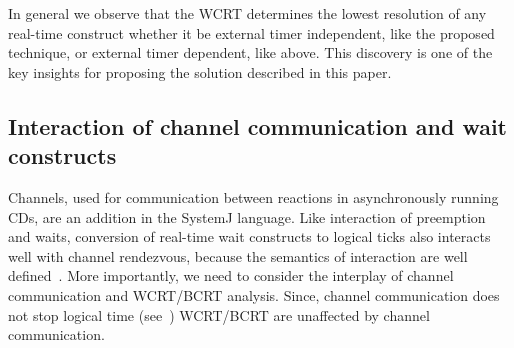 In general we observe that the WCRT determines the lowest resolution of
any real-time construct whether it be external timer independent, like
the proposed technique, or external timer dependent, like above. This
discovery is one of the key insights for proposing the solution
described in this paper.


\subsection{Interaction of channel communication and wait constructs}
\label{sec:inter-chann-comm}

Channels, used for communication between reactions in asynchronously
running CDs, are an addition in the SystemJ language. Like interaction
of preemption and waits, conversion of real-time wait constructs to
logical ticks also interacts well with channel rendezvous, because the
semantics of interaction are well defined~\cite{amal10}. More
importantly, we need to consider the interplay of channel communication
and WCRT/BCRT analysis. Since, channel communication does not stop
logical time (see~\cite{amal10}) WCRT/BCRT are unaffected by channel
communication. %





